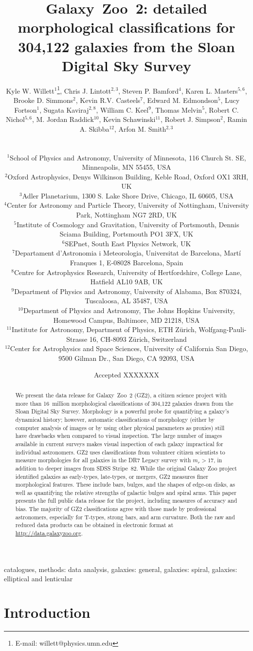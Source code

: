 \documentclass[useAMS,usenatbib]{mn2e}
\title[Galaxy Zoo 2 data release]{Galaxy~Zoo~2: detailed morphological classifications for 304,122 galaxies from the Sloan Digital Sky Survey}
\author[Willett et al.]{
  \parbox[t]{16cm}{
  Kyle W. Willett$^{1}$\thanks{E-mail: willett@physics.umn.edu},
  Chris J. Lintott$^{2,3}$,
  Steven P. Bamford$^{4}$,
  Karen L. Masters$^{5,6}$,
  Brooke D. Simmons$^{2}$,
  Kevin R.V. Casteels$^{7}$,
  Edward M. Edmondson$^{5}$,
  Lucy Fortson$^{1}$,
  Sugata Kaviraj$^{2,8}$,
  William C. Keel$^{9}$,
  Thomas Melvin$^{5}$,
  Robert C. Nichol$^{5,6}$,
  M. Jordan Raddick$^{10}$,
  Kevin Schawinski$^{11}$,
  Robert J. Simpson$^{2}$,
  Ramin A. Skibba$^{12}$,
  Arfon M. Smith$^{2,3}$
  \\
  }\\
$^{1}$School of Physics and Astronomy, University of Minnesota, 116 Church St. SE, Minneapolis, MN 55455, USA \\
$^{2}$Oxford Astrophysics, Denys Wilkinson Building, Keble Road, Oxford OX1 3RH, UK \\
$^{3}$Adler Planetarium, 1300 S. Lake Shore Drive, Chicago, IL 60605, USA \\
$^{4}$Center for Astronomy and Particle Theory, University of Nottingham, University Park, Nottingham NG7 2RD, UK \\
$^{5}$Institute of Cosmology and Gravitation, University of Portsmouth, Dennis Sciama Building, Portsmouth PO1 3FX, UK \\
$^{6}$SEPnet, South East Physics Network, UK \\
$^{7}$Departament d'Astronomia i Meteorologia, Universitat de Barcelona, Mart\'i Franques 1, E-08028 Barcelona, Spain \\
$^{8}$Centre for Astrophysics Research, University of Hertfordshire, College Lane, Hatfield AL10 9AB, UK \\
$^{9}$Department of Physics and Astronomy, University of Alabama, Box 870324, Tuscaloosa, AL 35487, USA \\
$^{10}$Department of Physics and Astronomy, The Johns Hopkins University, Homewood Campus, Baltimore, MD 21218, USA \\
$^{11}$Institute for Astronomy, Department of Physics, ETH Z\"urich, Wolfgang-Pauli-Strasse 16, CH-8093 Z\"urich, Switzerland \\
$^{12}$Center for Astrophysics and Space Sciences, University of California San Diego, 9500 Gilman Dr., San Diego, CA 92093, USA \\
}
\providecommand{\DIFaddtex}[1]{{\protect\color{blue}\uwave{#1}}} %
\providecommand{\DIFaddbegin}{} %
\providecommand{\DIFaddend}{} %
\providecommand{\DIFadd}[1]{\texorpdfstring{\DIFaddtex{#1}}{#1}} %
\begin{document}
\date{Accepted XXXXXXX}

\pagerange{\pageref{firstpage}--\pageref{lastpage}} 

\maketitle

\label{firstpage}

\begin{abstract}
We present the data release for Galaxy~Zoo~2 (GZ2), a citizen science project with more than 16~million morphological classifications of 304,122 galaxies drawn from the Sloan Digital Sky Survey. Morphology is a powerful probe for quantifying a galaxy's dynamical history; however, automatic classifications of morphology (either by computer analysis of images or by using other physical parameters as proxies) still have drawbacks when compared to visual inspection. The large number of images available in current surveys makes visual inspection of each galaxy impractical for individual astronomers. GZ2 uses classifications from volunteer citizen scientists to measure morphologies for all galaxies in the DR7 Legacy survey with $m_r>17$, in addition to deeper images from SDSS Stripe~82. While the original Galaxy Zoo project identified galaxies as early-types, late-types, or mergers, GZ2 measures finer morphological features. These include bars, bulges, and the shapes of edge-on disks, as well as quantifying the relative strengths of galactic bulges and spiral arms. This paper presents the full public data release for the project, including measures of accuracy and bias. The majority of GZ2 classifications agree with those made by professional astronomers, especially for \DIFaddbegin \DIFadd{morphological }\DIFaddend T-types, strong bars, and arm curvature. Both the raw and reduced data products can be obtained in electronic format at \url{http://data.galaxyzoo.org}.
\end{abstract}

\begin{keywords}
catalogues, methods: data analysis, galaxies: general, galaxies: spiral, galaxies: elliptical and lenticular
\end{keywords}


\section{Introduction} \label{sec-intro}
\end{document}
